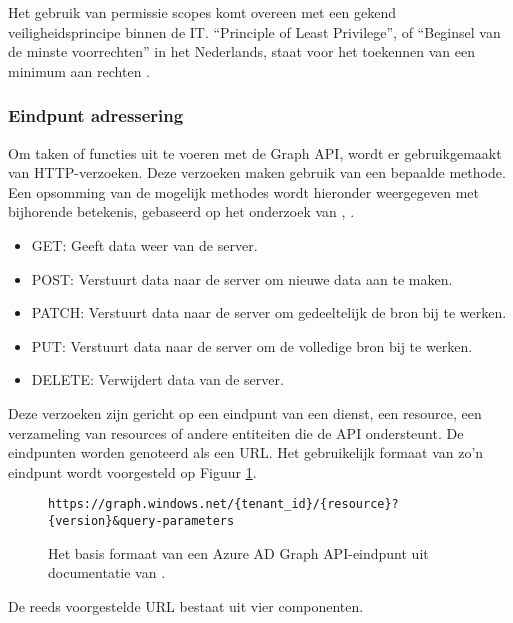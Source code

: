 Het gebruik van permissie scopes komt overeen met een gekend veiligheidsprincipe binnen de \ac{IT}. “Principle of Least Privilege”, of “Beginsel van de minste voorrechten” in het Nederlands, staat voor het toekennen van een minimum aan rechten \autocite{Saltzer1975}. 



\subsubsection{Eindpunt adressering}

Om taken of functies uit te voeren met de Graph \ac{API}, wordt er gebruikgemaakt van \ac{HTTP}-verzoeken. Deze verzoeken maken gebruik van een bepaalde methode. Een opsomming van de mogelijk methodes wordt hieronder weergegeven met bijhorende betekenis, gebaseerd op het onderzoek van \textcite{Fielding1999}, \textcite{Dusseault2010}.

\begin{itemize}
    \item GET: Geeft data weer van de server.
    \item POST: Verstuurt data naar de server om nieuwe data aan te maken.
    \item PATCH: Verstuurt data naar de server om gedeeltelijk de bron bij te werken.
    \item PUT: Verstuurt data naar de server om de volledige bron bij te werken.
    \item DELETE: Verwijdert data van de server.
\end{itemize}

Deze verzoeken zijn gericht op een eindpunt van een dienst, een resource, een verzameling van resources of andere entiteiten die de \ac{API} ondersteunt. De eindpunten worden genoteerd als een \ac{URL}. Het gebruikelijk formaat van zo'n eindpunt wordt voorgesteld op Figuur \ref{bfe}. \\

\begin{figure}[h]
    \footnotesize\begin{verbatim}https://graph.windows.net/{tenant_id}/{resource}?{version}&query-parameters
    \end{verbatim}    
    \caption[Basis formaat Graph API-eindpunt]{Het basis formaat van een Azure \ac{AD} Graph \ac{API}-eindpunt uit documentatie van \textcite{Microsoft2023o}.}
    \label{bfe}
\end{figure}

De reeds voorgestelde \ac{URL} bestaat uit vier componenten.

